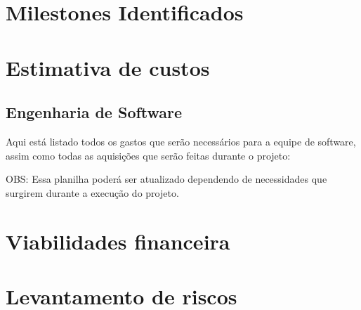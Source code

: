 \section{Milestones Identificados}
\section{Estimativa de custos}

\subsection{Engenharia de Software}

Aqui está listado todos os gastos que serão necessários para a equipe de software, assim como todas as aquisições que serão feitas durante o projeto:

\begin{table}[]
\end{table}

OBS: Essa planilha poderá ser atualizado dependendo de necessidades que surgirem durante a execução do projeto.

\section{Viabilidades financeira}
\section{Levantamento de riscos}
